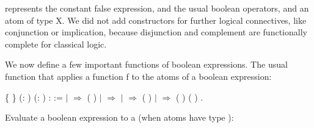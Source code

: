  represents the constant false expression,  and  the usual boolean operators, and  an atom of type \var X. We did not add constructors for further logical connectives, like conjunction or implication, because disjunction and complement are functionally complete for classical logic.

\medskip

We now define a few important functions of boolean expressions. The usual  function that applies a function \var f to the atoms of a boolean expression:

\begin{coqdoccode}
\coqdocnoindent
{}  \{ \} (:   ) (: ) :  :=\coqdoceol
\coqdocnoindent
{}  \coqdoceol
\coqdocindent{1.00em}
\ensuremath{|}   \ensuremath{\Rightarrow}  ( )\coqdoceol
\coqdocindent{1.00em}
\ensuremath{|}  \ensuremath{\Rightarrow} \coqdoceol
\coqdocindent{1.00em}
\ensuremath{|}   \ensuremath{\Rightarrow}  (  )\coqdoceol
\coqdocindent{1.00em}
\ensuremath{|}    \ensuremath{\Rightarrow}  (  ) (  )\coqdoceol
\coqdocnoindent
{}.\coqdoceol
\coqdocemptyline
\end{coqdoccode}

Evaluate a boolean expression to a  
(when atoms have type ):

